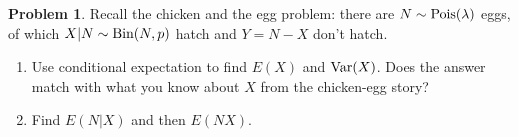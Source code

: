 \documentclass[11pt]{article}
\theoremstyle{definition}
\newtheorem{prob}[theo]{\color{Maroon} Problem}
\theoremstyle{remark}
\newcommand\independent{\protect\mathpalette{\protect\independenT}{\perp}}
\def\independenT#1#2{\mathrel{\rlap{$#1#2$}\mkern2mu{#1#2}}}
\renewcommand{\var}{\textnormal{Var}}
\newcommand{\cov}{\textnormal{Cov}}
\newcommand{\Unif}{\textnormal{Unif}}
\newcommand{\Bin}{\textnormal{Bin}}
\newcommand{\Pois}{\textnormal{Pois}}
\begin{document}
\vspace{2 in}



\begin{prob}
Recall the chicken and the egg problem: there are $N \sim \Pois(\lambda)$ eggs, of which $X|N \sim \Bin(N,p)$ hatch and $Y = N - X$ don't hatch. 
\begin{enumerate} \itemsep .2in
	\item Use conditional expectation to find $E(X)$ and $\var(X)$. Does the answer match with what you know about $X$ from the chicken-egg story?

    \vspace{2 in}
	
	
	
	\item Find $E(N|X)$ and then $E(NX)$.
	
	
	
	
	
\end{enumerate}
\end{prob}
\end{document}
